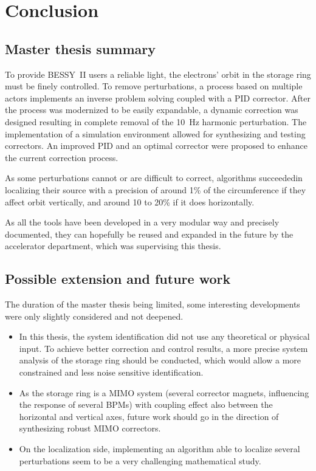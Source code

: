 
\chapter{Conclusion}
\label{sec:conclusion}
\section{Master thesis summary}
To provide BESSY~II users a reliable light, the electrons' orbit in the storage ring must be finely controlled. To remove perturbations, a process based on multiple actors implements an inverse problem solving coupled with a PID corrector. After the process was modernized to be easily expandable, a dynamic correction was designed resulting in complete removal of the \SI{10}{\hertz} harmonic perturbation. The implementation of a simulation environment allowed for synthesizing and testing correctors. An improved PID and an optimal corrector were proposed to enhance the current correction process.

As some perturbations cannot or are difficult to correct, algorithms succeededin  localizing their source with a precision of around 1\% of the circumference if they affect orbit vertically, and around 10 to 20\% if it does horizontally.

As all the tools have been developed in a very modular way and precisely documented, they can hopefully be reused and expanded in the future by the accelerator department, which was supervising this thesis.

\section{Possible extension and future work}

The duration of the master thesis being limited, some interesting developments were only slightly considered and not deepened.

\begin{itemize}
    \item In this thesis, the system identification did not use any theoretical or physical input. To achieve better correction and control results, a more precise system analysis of the storage ring should be conducted, which would allow a more constrained and less noise sensitive identification.
    \item As the storage ring is a MIMO system (several corrector magnets, influencing the response of several BPMs) with coupling effect also between the horizontal and vertical axes, future work should go in the direction of synthesizing robust MIMO correctors.
    \item On the localization side, implementing an algorithm able to localize several perturbations seem to be a very challenging mathematical study.
\end{itemize}